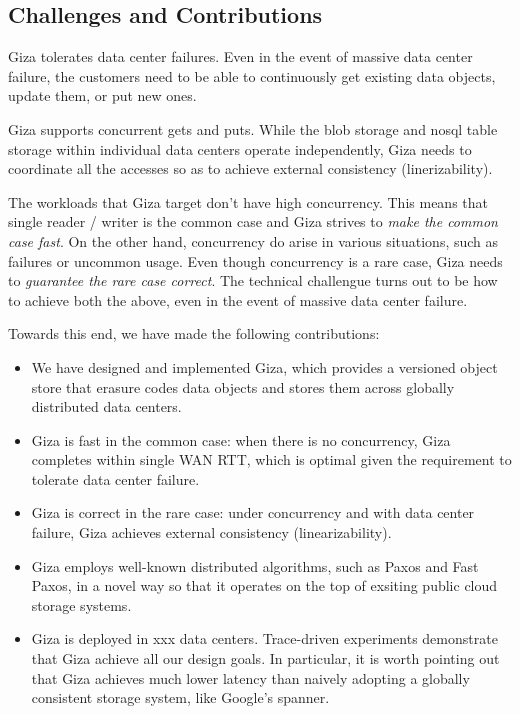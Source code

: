\subsection{Challenges and Contributions}

Giza tolerates data center failures. Even in the event of massive data center failure, the customers need to be able to continuously get existing data objects, update them, or put new ones.

Giza supports concurrent gets and puts. While the blob storage and nosql table storage within individual data centers operate independently, Giza needs to coordinate all the accesses so as to achieve external consistency (linerizability).

The workloads that Giza target don't have high concurrency. This means that single reader / writer is the common case and Giza strives to {\em make the common case fast}. On the other hand, concurrency do arise in various situations, such as failures or uncommon usage. Even though concurrency is a rare case, Giza needs to {\em guarantee the rare case correct}. The technical challengue turns out to be how to achieve both the above, even in the event of massive data center failure.

Towards this end, we have made the following contributions:
\begin{itemize}
    \item We have designed and implemented Giza, which provides a versioned object store that erasure codes data objects and stores them across globally distributed data centers.
    \item Giza is fast in the common case: when there is no concurrency, Giza completes within single WAN RTT, which is optimal given the requirement to tolerate data center failure.
    \item Giza is correct in the rare case: under concurrency and with data center failure, Giza achieves external consistency (linearizability).
    \item Giza employs well-known distributed algorithms, such as Paxos and Fast Paxos, in a novel way so that it operates on the top of exsiting public cloud storage systems.
    \item Giza is deployed in xxx data centers. Trace-driven experiments demonstrate that Giza achieve all our design goals. In particular, it is worth pointing out that Giza achieves much lower latency than naively adopting a globally consistent storage system, like Google's spanner.
\end{itemize}
